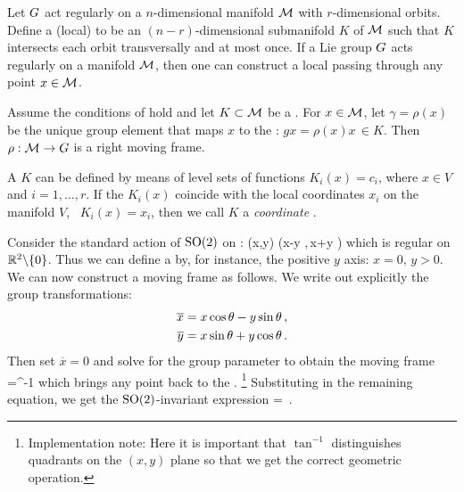 \begin{proposition}%
 \label{pro:crossExists}
 Let $G$ act regularly on a $n$-dimensional manifold
 $\mathcal{M}$ with $r$-dimensional orbits. Define a (local)
 \emph{{\csection}} to be an $(n-r)$-dimensional submanifold $K$
 of $\mathcal{M}$ such that $K$ intersects each orbit
 transversally and at most once. If a Lie group $G$ acts
 regularly on a manifold $\mathcal{M}$, then one can construct a
 local {\csection} passing through any point $x\in \mathcal{M}$.
\end{proposition}



\begin{theorem}
 Assume the conditions of  hold and
 let $K\subset\mathcal{M}$ be a {\csection}. For $x\in \mathcal{M}$, let
 $\gamma=\rho(x)$ be the unique group element that maps $x$
 to the {\csection}: $g x = \rho(x) x\, \in K$. Then
 $\rho:\mathcal{M}\rightarrow G$ is a right moving frame.
\end{theorem}

A {\csection} $K$ can be defined by means of level sets of
functions $K_i(x)=c_i$, where $x\in V$ and $i=1,\ldots,r$. If
the $K_i(x)$ coincide with the local coordinates $x_i$ on the
manifold $V$, \ie~$K_i(x)=x_i$, then we call $K$ a
\emph{coordinate \csection}.

\begin{example}
Consider the standard action of $\textrm{SO}(2)$ on :
\beq
	(x,y) \mapsto (x\cos\theta -y \sin\theta,\,x\sin\theta +y \cos\theta )
\eeq
which is regular on $\mathbb{R}^{2}\backslash\{0\}$. Thus we can define
a {\csection} by, for instance, the
positive $y$ axis: $x=0,\,y>0$.
We can now construct a moving frame as follows. We write out
explicitly the group transformations:
\begin{subequations}
\begin{align}
 	\overline{x} &= x \cos\theta - y \sin\theta\label{eq:explSO2stnd1}\,, \\ 
	\overline{y} &= x \sin\theta + y \cos\theta\label{eq:explSO2stnd2}\,.
\end{align}
\end{subequations}
Then set $\overline{x}=0$ and solve  for the group
parameter to obtain the moving frame
\beq
	\theta=\tan^{-1}
	\label{eq:SO2stndMF}
\eeq
which brings any point  back to the {\csection}.
\footnote{Implementation note: Here it is important that
$\tan^{-1}$ distinguishes quadrants on the $(x,y)$ plane so
that we get the correct geometric operation.}
Substituting  in the remaining equation,
we get the $\textrm{SO}(2)$-invariant expression
\beq
	 = \,.
\eeq
\end{example}


